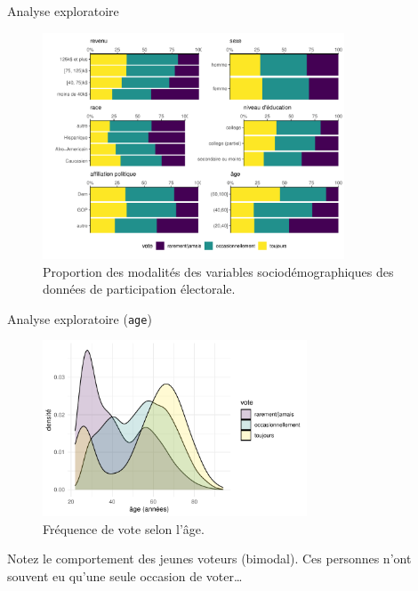 \documentclass[
  ignorenonframetext,
]{beamer}
\begin{document}
\begin{frame}{Analyse exploratoire}
\protect\hypertarget{analyse-exploratoire}{}
\begin{figure}

{\centering \includegraphics[width=0.8\textwidth,height=\textheight]{MATH60602-diapos7_files/figure-beamer/fig-multinom_means-Ipsos-1.pdf}

}

\caption{\label{fig-multinom_means-Ipsos}Proportion des modalités des
variables sociodémographiques des données de participation électorale.}

\end{figure}
\end{frame}

\begin{frame}{Analyse exploratoire (\texttt{age})}
\protect\hypertarget{analyse-exploratoire-age}{}
\begin{figure}

{\centering \includegraphics[width=0.7\textwidth,height=\textheight]{MATH60602-diapos7_files/figure-beamer/fig-vote-age-1.pdf}

}

\caption{\label{fig-vote-age}Fréquence de vote selon l'âge.}

\end{figure}

Notez le comportement des jeunes voteurs (bimodal). Ces personnes n'ont
souvent eu qu'une seule occasion de voter\ldots{}
\end{frame}
\end{document}
